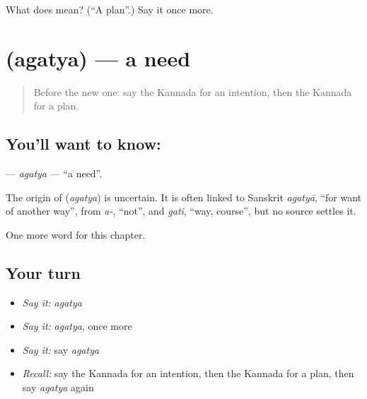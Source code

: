 \begin{tcolorbox}[breakable,colback=teal!4,colframe=teal!35!black,title={Before you move on}]
What does  mean? (\textquotedblleft{}A plan\textquotedblright{}.) Say it once more.
\end{tcolorbox}
\section[\texorpdfstring{\kn{ಅಗತ್ಯ} (agatya)}{ಅಗತ್ಯ (agatya)}]{ (agatya) — a need}

\label{lesson:KA-C114-agatya}



\begin{quote}
Before the new one: say the Kannada for an intention, then the Kannada for a plan.
\end{quote}

\subsection*{You'll want to know: }
\textbf{} — \emph{agatya} — \textquotedblleft{}a need\textquotedblright{}.

\begin{cousinweb}
The origin of \textbf{} (\emph{agatya}) is uncertain. It is often linked to Sanskrit \emph{agatyā}, \textquotedblleft{}for want of another way\textquotedblright{}, from \emph{a-}, \textquotedblleft{}not\textquotedblright{}, and \emph{gati}, \textquotedblleft{}way, course\textquotedblright{}, but no source settles it.
\end{cousinweb}

\begin{grammarlens}[title={What you've built}]
One more word for this chapter.
\end{grammarlens}

\subsection*{Your turn}
\begin{itemize}
\raggedright
  \item \emph{Say it:} \emph{agatya}
  \item \emph{Say it:} \emph{agatya}, once more
  \item \emph{Say it:} say \emph{agatya}
  \item \emph{Recall:} say the Kannada for an intention, then the Kannada for a plan, then say \emph{agatya} again
\end{itemize}

